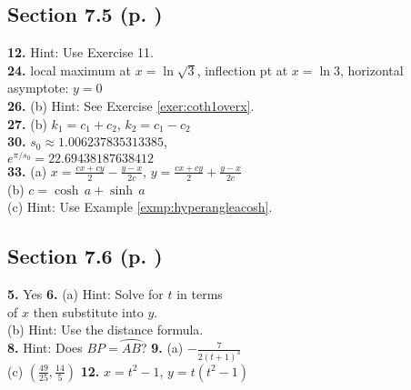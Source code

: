 \begin{multicols*}{2}
\subsection*{Section 7.5 (p. \pageref{sec7dot5})}
\textbf{12.} Hint: Use Exercise 11.\\
\textbf{24.} local maximum at $x=\ln \sqrt{3}$, inflection pt at $x=\ln 3$,
horizontal asymptote: $y=0$\\
\textbf{26.} (b) Hint: See Exercise \ref{exer:coth1overx}.\\
\textbf{27.} (b) $k_1=c_1+c_2$, $k_2=c_1-c_2$\\
\textbf{30.} $s_0 \approx 1.006237835313385$,\\$e^{\pi/s_0} = 22.69438187638412$\\
\textbf{33.} (a) $x=\frac{cx+cy}{2}-\frac{y-x}{2c}$, $y=\frac{cx+cy}{2}+\frac{y-x}{2c}$\\(b)
$c=\cosh\,a + \sinh\,a$\\(c) Hint: Use Example \ref{exmp:hyperangleacosh}.\vspace{-1mm}
\subsection*{Section 7.6 (p. \pageref{sec7dot6})}
\textbf{5.} Yes \quad
\textbf{6.} (a) Hint: Solve for $t$ in terms\\of $x$ then substitute into $y$.\\
(b) Hint: Use the distance formula.\\
\textbf{8.} Hint: Does $BP = \wideparen{AB}$? \quad
\textbf{9.} (a) $-\frac{7}{2(t+1)^3}$\\(c) $\left(\frac{49}{25},\frac{14}{5}\right)$ \quad
\textbf{12.} $x=t^2-1$, $y=t(t^2-1)$\vspace{-1mm}

\end{multicols*}
